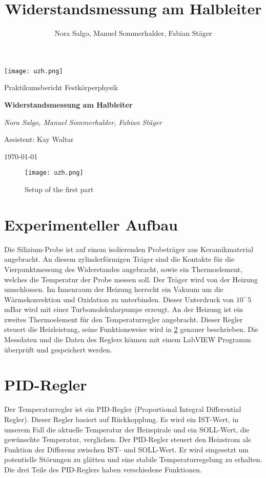 \documentclass[a4paper]{scrartcl}
\title{Widerstandsmessung am Halbleiter}
\author{Nora Salgo, Manuel Sommerhalder, Fabian Stäger}
\begin{document}
\begin{titlepage}
	\centering
	\texttt{[image: uzh.png]}\par\vspace{1cm}
	\vspace{1cm}
	{\Large Praktikumsbericht Festkörperphysik\par}
	\vspace{1.5cm}
	{\huge\bfseries Widerstandsmessung am Halbleiter\par}
	\vspace{2cm}
	{\Large\itshape Nora Salgo, Manuel Sommerhalder, Fabian Stäger \par\vspace{1cm}
	Assistent: Kay Waltar}
	\vfill
	

	\vfill

	{\large \today\par}
\end{titlepage}


\begin{figure}[htbp]
\centering
\texttt{[image: uzh.png]}
\caption{Setup of the first part}
\label{setup1}
\end{figure}
%

\section{Experimenteller Aufbau}
Die Silizium-Probe ist auf einem isolierenden Probeträger aus Keramikmaterial angebracht. An diesem zylinderförmigen Träger sind die Kontakte für die Vierpunktmessung des Widerstandes angebracht, sowie ein Thermoelement, welches die Temperatur der Probe messen soll. Der Träger wird von der Heizung umschlossen. Im Innenraum der Heizung herrscht ein Vakuum um die Wärmekonvektion und Oxidation zu unterbinden. Dieser Unterdruck von $10^-5$ mBar wird mit einer Turbomolekularpumpe erzeugt. An der Heizung ist ein zweites Thermoelement für den Temperaturregler angebracht. Dieser Regler steuert die Heizleistung, seine Funktionsweise wird in \ref{PID_Regler}  genauer beschrieben. Die Messdaten und die Daten des Reglers können mit einem LabVIEW Programm überprüft und gespeichert werden.


\section{PID-Regler}
\label{PID_Regler}
Der Temperaturregler ist ein PID-Regler (Proportional Integral Differential Regler). Dieser Regler basiert auf Rückkopplung. Es wird ein IST-Wert, in unserem Fall die aktuelle Temperatur der Heizspirale und ein SOLL-Wert, die gewünschte Temperatur, verglichen. Der PID-Regler steuert den Heizstrom als Funktion der Differenz zwischen IST- und SOLL-Wert. Er wird eingesetzt um potentielle Störungen zu glätten und eine stabile Temperaturregelung zu erhalten. Die drei Teile des PID-Reglers haben verschiedene Funktionen.
\end{document}
